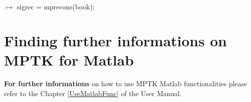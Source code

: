 \vspace{0.2 cm}

\noindent $\mapsto$ sigrec = mprecons(book);

\section{Finding further informations on MPTK for Matlab}

\textbf{For further informations} on how to use MPTK Matlab functionalities please refer to the Chapter \ref{UseMatlabFunc} of the User Manual.